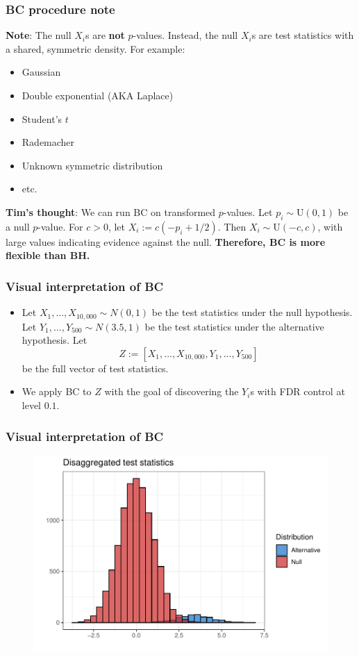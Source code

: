 \documentclass{beamer}
\begin{document}
\begin{frame}
\frametitle{BC procedure note}
\textbf{Note}: The null $X_i$s are \textbf{not} $p$-values. Instead, the null $X_i$s are test statistics with a shared, symmetric density. For example:
\begin{itemize}
\item Gaussian
\item Double exponential (AKA Laplace)
\item Student's $t$
\item Rademacher
\item Unknown symmetric distribution
\item etc.
\end{itemize}
\textbf{Tim's thought}: We can run BC on transformed $p$-values. Let $p_i \sim \textrm{U}(0,1)$ be a null $p$-value. For $c > 0$, let $X_i := c(-p_i + 1/2).$ Then $X_i \sim \textrm{U}(-c, c)$, with large values indicating evidence against the null. \textbf{Therefore, BC is more flexible than BH.}
\end{frame}

\begin{frame}
\frametitle{Visual interpretation of BC}
\begin{itemize}
\item Let $X_1, \dots, X_{10,000} \sim N(0,1)$ be the test statistics under the null hypothesis. Let $Y_1, \dots, Y_{500} \sim N(3.5, 1)$ be the test statistics under the alternative hypothesis. Let $$ Z := [X_1, \dots, X_{10,000}, Y_1, \dots, Y_{500}]$$ be the full vector of test statistics. 
\item We apply BC to $Z$ with the goal of discovering the $Y_i$s with FDR control at level $0.1$.
\end{itemize}
\end{frame}

\begin{frame}
\frametitle{Visual interpretation of BC}
\begin{figure}
	\centering
	\includegraphics[width=1\linewidth]{disag_test_stats}
\end{figure}
\end{frame}
\end{document}
